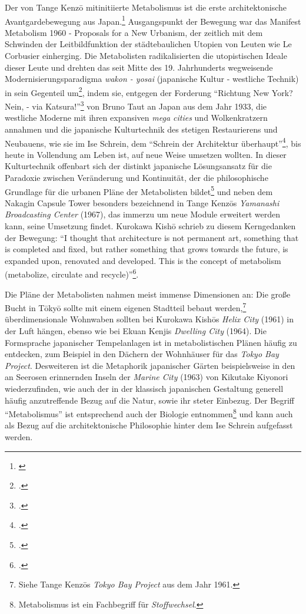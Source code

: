 \documentclass[a4paper, 12pt]{article}
\begin{document}
\begin{onehalfspace}
Der von Tange Kenzō mitinitiierte Metabolismus ist die erste architektonische Avantgardebewegung aus Japan.\footnote{\Cite[Vgl.][S. 243]{gleiter}} Ausgangspunkt der Bewegung war das Manifest Metabolism 1960 - Proposals for a New Urbanism, der zeitlich mit dem Schwinden der Leitbildfunktion der städtebaulichen Utopien von Leuten wie Le Corbusier einherging. Die Metabolisten radikalisierten die utopistischen Ideale dieser Leute und drehten das seit Mitte des 19. Jahrhunderts wegweisende Modernisierungsparadigma \emph{wakon - yosai} (japanische Kultur - westliche Technik) in sein Gegenteil um\footnote{\Cite[Vgl.][S. 243]{gleiter}.}, indem sie, entgegen der Forderung "`Richtung New York? Nein, - via Katsura!"'\footnote{\Cite[Vgl.][S. 2]{taut}.} von Bruno Taut an Japan aus dem Jahr 1933, die westliche Moderne mit ihren expansiven \emph{mega cities} und Wolkenkratzern annahmen und die japanische Kulturtechnik des stetigen Restaurierens und Neubauens, wie sie im Ise Schrein, dem "`Schrein der Architektur überhaupt"'\footnote{\Cite[Siehe][S. 19]{taut}.}, bis heute in Vollendung am Leben ist, auf neue Weise umsetzen wollten. In dieser Kulturtechnik offenbart sich der distinkt japanische Lösungsansatz für die Paradoxie zwischen Veränderung und Kontinuität, der die philosophische Grundlage für die urbanen Pläne der Metabolisten bildet\footnote{\Cite[Vgl.][S. 13]{lin2011nakagin}.} und neben dem Nakagin Capsule Tower besonders bezeichnend in Tange Kenzōs \emph{Yamanashi Broadcasting Center} (1967), das immerzu um neue Module erweitert werden kann, seine Umsetzung findet. Kurokawa Kishō schrieb zu diesem Kerngedanken der Bewegung: "`I thought that architecture is not permanent art, something that is completed and fixed, but rather something that grows towards the future, is expanded upon, renovated and developed. This is the concept of metabolism (metabolize, circulate and recycle)"'\footnote{\Cite[Siehe][S. 6]{agekuro}.}.

Die Pläne der Metabolisten nahmen meist immense Dimensionen an: Die große Bucht in Tōkyō sollte mit einem eigenen Stadtteil bebaut werden,\footnote{Siehe Tange Kenzōs \emph{Tokyo Bay Project} aus dem Jahr 1961.} überdimensionale Wohnwaben sollten bei Kurokawa Kishōs \emph{Helix City} (1961) in der Luft hängen, ebenso wie bei Ekuan Kenjis \emph{Dwelling City} (1964). Die Formsprache japanischer Tempelanlagen ist in metabolistischen Plänen häufig zu entdecken, zum Beispiel in den Dächern der Wohnhäuser für das \emph{Tokyo Bay Project}. Desweiteren ist die Metaphorik japanischer Gärten beispielsweise in den an Seerosen erinnernden Inseln der \emph{Marine City} (1963) von Kikutake Kiyonori wiederzufinden, wie auch der in der klassisch japanischen Gestaltung generell häufig anzutreffende Bezug auf die Natur, sowie ihr steter Einbezug. Der Begriff "`Metabolismus"' ist entsprechend auch der Biologie entnommen\footnote{Metabolismus ist ein Fachbegriff für \emph{Stoffwechsel}.} und kann auch als Bezug auf die architektonische Philosophie hinter dem Ise Schrein aufgefasst werden. 


\end{onehalfspace}
\end{document}
